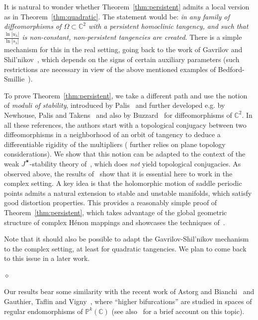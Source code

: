 \documentclass[11pt, oneside]{amsart}
\newcommand{\C}{\mathbb{C}}
\newcommand{\abs}[1]{\left\vert#1\right\vert}
\newcommand{\cd}{{\C^2}}
\newcommand{\diamant}{\medskip \begin{center}$\diamond$\end{center}\medskip}
\theoremstyle{remark}
\theoremstyle{definition}
\theoremstyle{theorem}
\newcommand{\commentaire}[1]{}
\begin{document}
It is natural to wonder whether Theorem~\ref{thm:persistent} admits a local version as in Theorem~\ref{thm:quadratic}. The statement would be: \emph{in any family of diffeomorphisms of $\Omega\subset\cd$ with a persistent homoclinic tangency, and such that 
$\frac{\ln \abs{u_\lambda}}{\ln \abs{s_\lambda}}$ is non-constant,    non-persistent tangencies are created}. There is a simple mechanism for this in the real setting, 
going back to 
the work of Gavrilov and Shil'nikov~\cite{gavrilov-shilnikov},
which depends on the signs of certain auxiliary parameters (such restrictions are
 necessary in view of the above mentioned examples of Bedford-Smillie~\cite{BS_R2}).

To prove Theorem~\ref{thm:persistent}, we take a different path 
and use the notion  of \emph{moduli of stability},  
introduced by Palis~\cite{palis_moduli} and further developed  e.g. by
  Newhouse, Palis and Takens~\cite{newhouse-palis-takens} and also by
Buzzard~\cite{buzzard_nondensity} for diffeomorphisms of $\C^2$. 
In all these references, the authors start with a 
topological conjugacy between two diffeomorphisms 
 in a neighborhood of an orbit of tangency to  deduce a differentiable rigidity of the multipliers (\cite{palis_moduli} further relies on plane topology considerations). 
 We show that this notion  can be adapted to the  context of the weak $J^\varstar$-stability 
 theory of~\cite{tangencies}, which does \emph{not} yield   topological conjugacies. As observed above, the results of~\cite{BS_R1, BS_R2} 
 show that   it is essential here to work in the complex setting. 
 A key idea is that the 
 holomorphic motion of saddle periodic points admits a natural extension to stable and unstable manifolds, which satisfy good distortion properties.  
 This provides a reasonably  simple proof of  Theorem~\ref{thm:persistent}, which takes 
 advantage of the global geometric structure of complex Hénon mappings and showcases the techniques of~\cite{tangencies}. 
  
Note that   it  should  also be 
possible to adapt the Gavrilov-Shil'nikov  mechanism to the complex setting, 
at least for quadratic tangencies. We plan to come back to this issue in a later work.  

\diamant 

\commentaire{Expo. Rmk \#7: Former Remark 1.1 expanded to a subsection of the introduction}
 Our results  bear  some    similarity with the 
 recent work of Astorg and Bianchi~\cite{astorg-bianchi} and 
 Gauthier, Taflin and Vigny~\cite{GTV}, 
where  ``higher bifurcations''  are studied 
 in spaces of regular endomorphisms of $\mathbb{P}^k(\C)$ (see also~\cite{survey_icm} for a brief account on this topic). 
\end{document}
